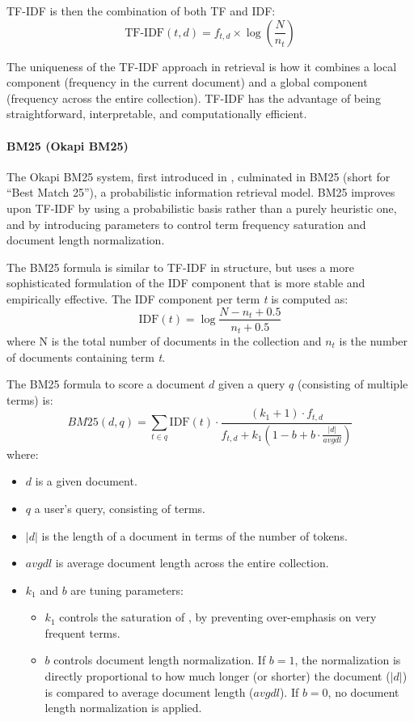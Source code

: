 TF-IDF is then the combination of both TF and IDF:
\begin{equation}
    \label{eq:tfidf}
    \text{TF-IDF}(t,d) = f_{t,d} \times \log\left(\frac{N}{n_t}\right)
\end{equation}

The uniqueness of the TF-IDF approach in retrieval is how it combines a local component (frequency in the current document) and a global component (frequency across the entire collection). TF-IDF has the advantage of being straightforward, interpretable, and computationally efficient.

\paragraph{BM25 (Okapi BM25)}

The Okapi BM25 system, first introduced in \cite{Bm25foundation}, culminated in BM25 (short for ``Best Match 25''), a probabilistic information retrieval model. BM25 improves upon TF-IDF by using a probabilistic basis rather than a purely heuristic one, and by introducing parameters to control term frequency saturation and document length normalization.

The BM25 formula is similar to TF-IDF in structure, but uses a more sophisticated formulation of the IDF component that is more stable and empirically effective. The IDF component per term \textit{t} is computed as:
\begin{equation}
    \label{eq:idfbm25}
    \text{IDF}(t) = \log \frac{N-n_t+0.5}{n_t+0.5}
\end{equation}
where N is the total number of documents in the collection and $n_t$ is the number of documents containing term \textit{t}.

The BM25 formula to score a document $d$ given a query $q$ (consisting of multiple terms) is:
\begin{equation}
    \label{eq:bm25}
    \textit{BM25}(d,q) = \sum_{t \in q} \text{IDF}(t) \cdot \frac{(k_1+1)\cdot f_{t,d}}{f_{t,d}+k_1(1-b+b \cdot \frac{|d|}{avgdl})}
\end{equation}
where:
\begin{itemize}
\item $d$ is a given document.
\item $q$ a user's query, consisting of terms.
\item $|d|$ is the length of a document in terms of the number of tokens.
\item $avgdl$ is average document length across the entire collection.
\item $k_1$ and $b$ are tuning parameters:
\begin{itemize}
    \item $k_1$ controls the saturation of , by preventing over-emphasis on very frequent terms.
    \item $b$ controls document length normalization. If $b = 1$, the normalization is directly proportional to how much longer (or shorter) the document ($|d|$) is compared to average document length ($avgdl$). If $b=0$, no document length normalization is applied.
\end{itemize}
\end{itemize}

